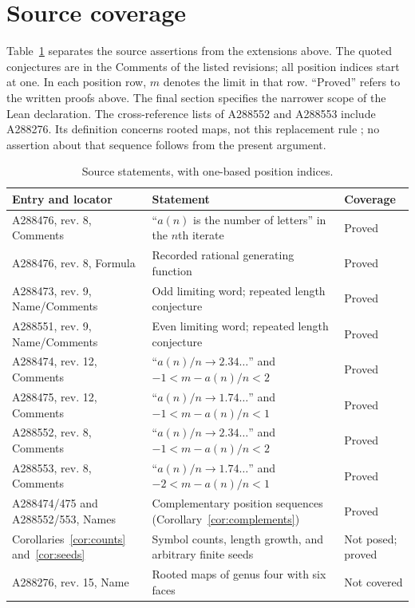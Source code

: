 \documentclass[11pt]{article}
\begin{document}
\section{Source coverage}

Table~\ref{tab:coverage} separates the source assertions from the
extensions above. The quoted conjectures are in the Comments of
the listed revisions; all position indices start at one.
In each position row, $m$ denotes the limit in that row.
``Proved'' refers to the written proofs above. The final section
specifies the narrower scope of the Lean declaration.
The cross-reference lists of A288552 and A288553 include A288276.
Its definition concerns rooted maps, not this replacement rule
\cite{a288276}; no assertion about that sequence follows from the
present argument.

\begin{table}[ht]
\centering\small
\begin{tabular}{@{}>{\raggedright\arraybackslash}p{}>{\raggedright\arraybackslash}p{}>{\raggedright\arraybackslash}p{}@{}}
\toprule
Entry and locator & Statement & Coverage\\\midrule
A288476, rev. 8, Comments & ``$a(n)$ is the number of letters'' in the $n$th iterate & Proved\\
A288476, rev. 8, Formula & Recorded rational generating function & Proved\\
A288473, rev. 9, Name/Comments & Odd limiting word; repeated length conjecture & Proved\\
A288551, rev. 9, Name/Comments & Even limiting word; repeated length conjecture & Proved\\
A288474, rev. 12, Comments & ``$a(n)/n\to2.34\ldots$'' and $-1<m-a(n)/n<2$ & Proved\\
A288475, rev. 12, Comments & ``$a(n)/n\to1.74\ldots$'' and $-1<m-a(n)/n<1$ & Proved\\
A288552, rev. 8, Comments & ``$a(n)/n\to2.34\ldots$'' and $-1<m-a(n)/n<2$ & Proved\\
A288553, rev. 8, Comments & ``$a(n)/n\to1.74\ldots$'' and $-2<m-a(n)/n<1$ & Proved\\
A288474/475 and A288552/553, Names & Complementary position sequences (Corollary~\ref{cor:complements}) & Proved\\
Corollaries~\ref{cor:counts} and~\ref{cor:seeds} & Symbol counts, length growth, and arbitrary finite seeds & Not posed; proved\\
A288276, rev. 15, Name & Rooted maps of genus four with six faces & Not covered\\
\bottomrule
\end{tabular}
\caption{Source statements, with one-based position indices.}\label{tab:coverage}
\end{table}
\end{document}
